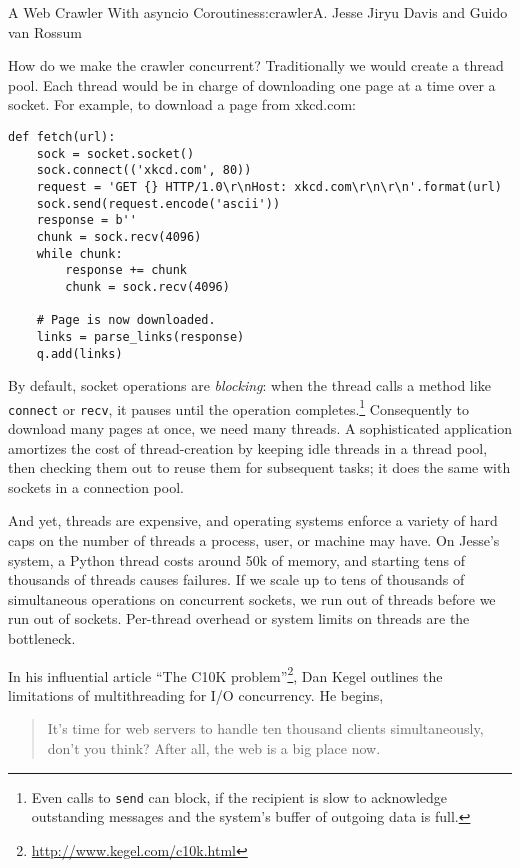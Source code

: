 \begin{aosachapter}{A Web Crawler With asyncio Coroutines}{s:crawler}{A. Jesse Jiryu Davis and Guido van Rossum}
\label{the-traditional-approach}

How do we make the crawler concurrent? Traditionally we would create a
thread pool. Each thread would be in charge of downloading one page at a
time over a socket. For example, to download a page from xkcd.com:

\begin{verbatim}
def fetch(url):
    sock = socket.socket()
    sock.connect(('xkcd.com', 80))
    request = 'GET {} HTTP/1.0\r\nHost: xkcd.com\r\n\r\n'.format(url)
    sock.send(request.encode('ascii'))
    response = b''
    chunk = sock.recv(4096)
    while chunk:
        response += chunk
        chunk = sock.recv(4096)
    
    # Page is now downloaded.
    links = parse_links(response)
    q.add(links)
\end{verbatim}

By default, socket operations are \emph{blocking}: when the thread calls
a method like \texttt{connect} or \texttt{recv}, it pauses until the
operation completes.\footnote{Even calls to \texttt{send} can block, if
  the recipient is slow to acknowledge outstanding messages and the
  system's buffer of outgoing data is full.} Consequently to download
many pages at once, we need many threads. A sophisticated application
amortizes the cost of thread-creation by keeping idle threads in a
thread pool, then checking them out to reuse them for subsequent tasks;
it does the same with sockets in a connection pool.

And yet, threads are expensive, and operating systems enforce a variety
of hard caps on the number of threads a process, user, or machine may
have. On Jesse's system, a Python thread costs around 50k of memory, and
starting tens of thousands of threads causes failures. If we scale up to
tens of thousands of simultaneous operations on concurrent sockets, we
run out of threads before we run out of sockets. Per-thread overhead or
system limits on threads are the bottleneck.

In his influential article ``The C10K problem''\footnote{\url{http://www.kegel.com/c10k.html}},
Dan Kegel outlines the limitations of multithreading for I/O
concurrency. He begins,

\begin{quote}
It's time for web servers to handle ten thousand clients simultaneously,
don't you think? After all, the web is a big place now.
\end{quote}


\end{aosachapter}
